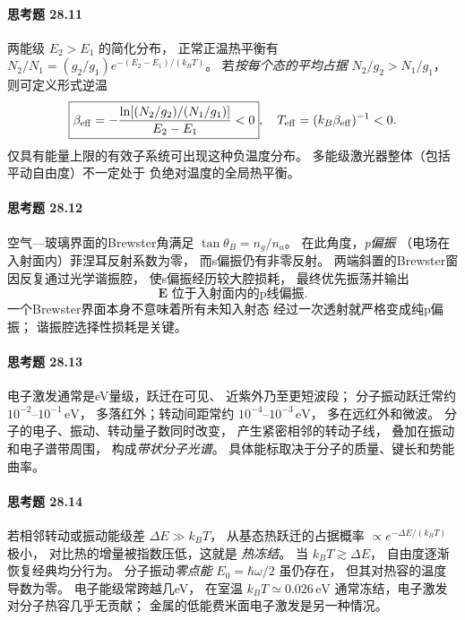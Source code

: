 \paragraph{思考题 28.11}
两能级 \(E_2>E_1\) 的简化分布，
正常正温热平衡有 \(N_2/N_1
=(g_2/g_1)e^{-(E_2-E_1)/(k_BT)}\)。
若\emph{按每个态的平均占据}
\(N_2/g_2>N_1/g_1\)，
则可定义形式逆温
\[
\boxed{\beta_{\rm eff}
=-\frac{\ln[(N_2/g_2)/(N_1/g_1)]}{E_2-E_1}<0},
\quad T_{\rm eff}=(k_B\beta_{\rm eff})^{-1}<0.
\]
仅具有能量上限的有效子系统可出现这种负温度分布。
多能级激光器整体（包括平动自由度）不一定处于
负绝对温度的全局热平衡。

\paragraph{思考题 28.12}
空气—玻璃界面的Brewster角满足
\(\tan\theta_B=n_g/n_a\)。
在此角度，\emph{p偏振}
（电场在入射面内）菲涅耳反射系数为零，
而s偏振仍有非零反射。
两端斜置的Brewster窗因反复通过光学谐振腔，
使s偏振经历较大腔损耗，
最终优先振荡并输出
\[
\boxed{\boldsymbol E\text{ 位于入射面内的p线偏振}}.
\]
一个Brewster界面本身不意味着所有未知入射态
经过一次透射就严格变成纯p偏振；
谐振腔选择性损耗是关键。

\paragraph{思考题 28.13}
电子激发通常是eV量级，跃迁在可见、
近紫外乃至更短波段；
分子振动跃迁常约
\(10^{-2}\)--\(10^{-1}\,\mathrm{eV}\)，
多落红外；转动间距常约
\(10^{-4}\)--\(10^{-3}\,\mathrm{eV}\)，
多在远红外和微波。
分子的电子、振动、转动量子数同时改变，
产生紧密相邻的转动子线，
叠加在振动和电子谱带周围，
构成\emph{带状分子光谱}。
具体能标取决于分子的质量、键长和势能曲率。

\paragraph{思考题 28.14}
若相邻转动或振动能级差
\(\Delta E\gg k_BT\)，
从基态热跃迁的占据概率
\(\propto e^{-\Delta E/(k_BT)}\) 极小，
对比热的增量被指数压低，这就是
\emph{热冻结}。
当 \(k_BT\gtrsim\Delta E\)，
自由度逐渐恢复经典均分行为。
分子振动\emph{零点能}
\(E_0=\hbar\omega/2\) 虽仍存在，
但其对热容的温度导数为零。
电子能级常跨越几eV，
在室温 \(k_BT\simeq0.026\,\mathrm{eV}\)
通常冻结，电子激发对分子热容几乎无贡献；
金属的低能费米面电子激发是另一种情况。
